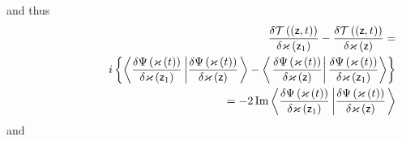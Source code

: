 and thus%
\begin{eqnarray}
&&\frac{\delta {\cal T}\left( \left( {\sf z},t\right) \right) }{\delta
\varkappa \left( {\sf z}_{1}\right) }-\frac{\delta {\cal T}\left( \left( 
{\sf z},t\right) \right) }{\delta \varkappa \left( {\sf z}\right) }= 
\nonumber \\
&&\left. {}\right. \qquad \qquad \qquad i\left\{ \left\langle \frac{\delta
\Psi \left( {\cal \varkappa }\left( t\right) \right) }{\delta {\cal %
\varkappa }\left( {\sf z}_{1}\right) }\left| \frac{\delta \Psi \left( {\cal %
\varkappa }\left( t\right) \right) }{\delta {\cal \varkappa }\left( {\sf z}%
\right) }\right. \right\rangle -\left\langle \left. \frac{\delta \Psi \left( 
{\cal \varkappa }\left( t\right) \right) }{\delta {\cal \varkappa }\left( 
{\sf z}\right) }\right| \frac{\delta \Psi \left( {\cal \varkappa }\left(
t\right) \right) }{\delta {\cal \varkappa }\left( {\sf z}_{1}\right) }%
\right\rangle \right\}  \nonumber \\
&&\left. {}\right. \qquad \qquad \qquad =-2%
\mathop{\rm Im}%
\left\langle \frac{\delta \Psi \left( {\cal \varkappa }\left( t\right)
\right) }{\delta {\cal \varkappa }\left( {\sf z}_{1}\right) }\left| \frac{%
\delta \Psi \left( {\cal \varkappa }\left( t\right) \right) }{\delta {\cal %
\varkappa }\left( {\sf z}\right) }\right. \right\rangle
\end{eqnarray}%
and 
